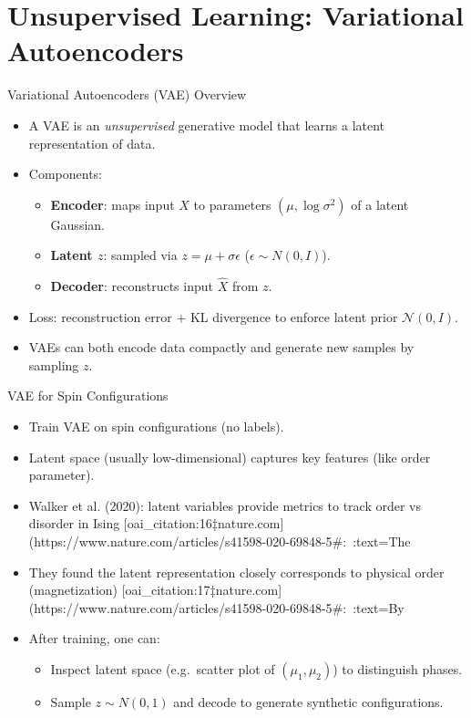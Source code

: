 \documentclass{beamer}
\begin{document}
\section{Unsupervised Learning: Variational Autoencoders}

\begin{frame}{Variational Autoencoders (VAE) Overview}
 \begin{itemize}
   \item A VAE is an \emph{unsupervised} generative model that learns a latent representation of data.
   \item Components:
     \begin{itemize}
       \item \textbf{Encoder}: maps input $X$ to parameters $(\mu, \log\sigma^2)$ of a latent Gaussian.
       \item \textbf{Latent $z$}: sampled via $z = \mu + \sigma \epsilon$ ($\epsilon\sim N(0,I)$).
       \item \textbf{Decoder}: reconstructs input $\hat{X}$ from $z$.
     \end{itemize}
   \item Loss: reconstruction error + KL divergence to enforce latent prior $\mathcal{N}(0,I)$.
   \item VAEs can both encode data compactly and generate new samples by sampling $z$.
 \end{itemize}
\end{frame}

\begin{frame}{VAE for Spin Configurations}
 \begin{itemize}
   \item Train VAE on spin configurations (no labels).
   \item Latent space (usually low-dimensional) captures key features (like order parameter).
   \item Walker et al. (2020): latent variables provide metrics to track order vs disorder in Ising [oai_citation:16‡nature.com](https://www.nature.com/articles/s41598-020-69848-5#:~:text=The%
   \item They found the latent representation closely corresponds to physical order (magnetization) [oai_citation:17‡nature.com](https://www.nature.com/articles/s41598-020-69848-5#:~:text=By%
   \item After training, one can:
     \begin{itemize}
       \item Inspect latent space (e.g.\ scatter plot of $(\mu_1,\mu_2)$) to distinguish phases.
       \item Sample $z\sim N(0,1)$ and decode to generate synthetic configurations.
     \end{itemize}
 \end{itemize}
\end{frame}
\end{document}
